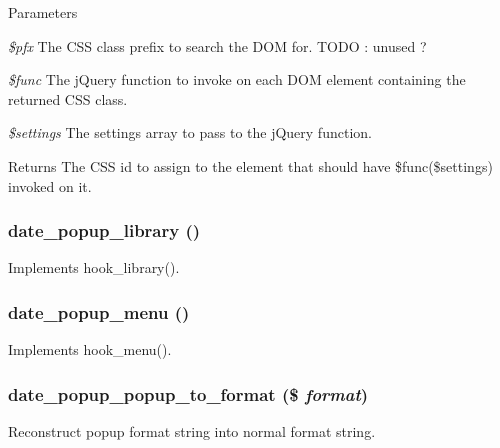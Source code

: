 \begin{DoxyParams}{Parameters}
\item[{\em \$pfx}]The CSS class prefix to search the DOM for. TODO : unused ? \item[{\em \$func}]The jQuery function to invoke on each DOM element containing the returned CSS class. \item[{\em \$settings}]The settings array to pass to the jQuery function. \end{DoxyParams}
\begin{DoxyReturn}{Returns}
The CSS id to assign to the element that should have \$func(\$settings) invoked on it. 
\end{DoxyReturn}
\hypertarget{date__popup_8module_af4c7a08e45fc8c75254a468d27d9bbfa}{
\subsubsection[{date\_\-popup\_\-library}]{\setlength{\rightskip}{0pt plus 5cm}date\_\-popup\_\-library ()}}
\label{date__popup_8module_af4c7a08e45fc8c75254a468d27d9bbfa}
Implements hook\_\-library(). \hypertarget{date__popup_8module_a720b482218ecb300ee851f77d166633d}{
\subsubsection[{date\_\-popup\_\-menu}]{\setlength{\rightskip}{0pt plus 5cm}date\_\-popup\_\-menu ()}}
\label{date__popup_8module_a720b482218ecb300ee851f77d166633d}
Implements hook\_\-menu(). \hypertarget{date__popup_8module_ab3bb16ecb487ede2fef0fe0e70bf92bb}{
\subsubsection[{date\_\-popup\_\-popup\_\-to\_\-format}]{\setlength{\rightskip}{0pt plus 5cm}date\_\-popup\_\-popup\_\-to\_\-format (\$ {\em format})}}
\label{date__popup_8module_ab3bb16ecb487ede2fef0fe0e70bf92bb}
Reconstruct popup format string into normal format string.


